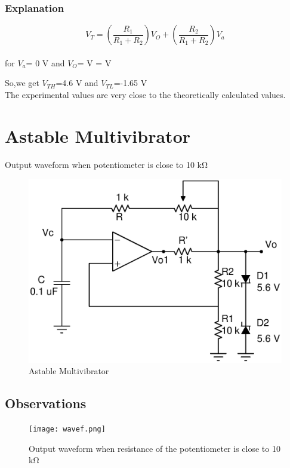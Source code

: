 \documentclass[12pt]{article}
\begin{document}
\subsubsection{Explanation}

\begin{equation}
     V_{T}=(\frac{R_{1}}{R_{1} + R_{2}})V_{O} + (\frac{R_{2}}{R_{1}+R_{2}})V_{a}
\end{equation} 
\\for $V_{a}$= 0 V and $V_{O}$= V  =  V

So,we get $V_{TH}$=4.6 V and $V_{TL}$=-1.65 V
\\The experimental values are very close to the theoretically calculated values.
\newpage
\section{Astable Multivibrator}

Output waveform when potentiometer is close to 10 k\si{\ohm}



\begin{figure}[h]
  \centering
  \includegraphics[scale=0.6]{astaable2.eps}  %
  \caption{Astable Multivibrator}
\end{figure}

\subsection{Observations}
\begin{figure}[h]
  \centering
  \texttt{[image: wavef.png]}  %
  \caption{Output waveform when resistance of the potentiometer is close to 10 k\si{\ohm}}
\end{figure}
\end{document}
